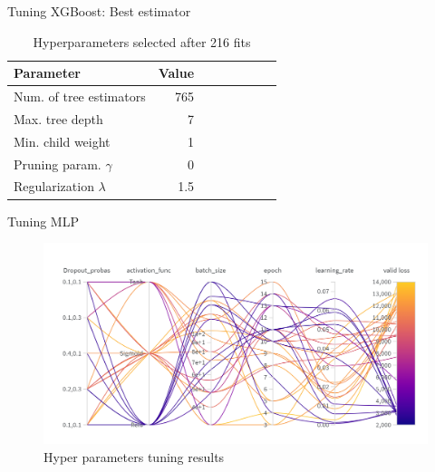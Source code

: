 \documentclass{beamer}
\begin{document}
    \begin{frame}{Tuning XGBoost: Best estimator}
    \begin{table}[h]
        \centering
        \caption{Hyperparameters selected after 216 fits}
        \label{table:Parameters of the best MLP model}
    
        \begin{tabular}{lrrrrrrr}
        \toprule
        \textbf{Parameter} & \textbf{Value} \\
        \midrule
        Num. of tree estimators & 765\\
        Max. tree depth & 7\\
        Min. child weight & 1 \\
        Pruning param. $\gamma$ & 0 \\
        Regularization $\lambda$ & 1.5 \\
        \bottomrule
        \end{tabular}
    \end{table}
    \end{frame}






    \begin{frame}{Tuning MLP} 
        \vspace{0.5cm} %
        \begin{figure}[ht]
            \centering
            \includegraphics[width=1\textwidth]{wandbrun_1.png}
            \caption{Hyper parameters tuning results}
            \label{fig:HyperparametersTuningResults}
        \end{figure}
    \end{frame}
\end{document}
